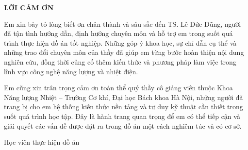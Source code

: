 \documentclass[../main.tex]{subfiles}
\begin{document}
\begin{center}
  \Large{\textbf{LỜI CẢM ƠN}}\\
\end{center}
\vspace{1cm}

Em xin bày tỏ lòng biết ơn chân thành và sâu sắc đến TS. Lê Đức Dũng, người đã tận tình hướng dẫn, định hướng chuyên môn và hỗ trợ em trong suốt quá trình thực hiện đồ án tốt nghiệp. Những góp ý khoa học, sự chỉ dẫn cụ thể và những trao đổi chuyên môn của thầy đã giúp em từng bước hoàn thiện nội dung nghiên cứu, đồng thời củng cố thêm kiến thức và phương pháp làm việc trong lĩnh vực công nghệ năng lượng và nhiệt điện.

Em cũng xin trân trọng cảm ơn toàn thể quý thầy cô giảng viên thuộc Khoa Năng lượng Nhiệt -- Trường Cơ khí, Đại học Bách khoa Hà Nội, những người đã trang bị cho em hệ thống kiến thức nền tảng và tư duy kỹ thuật cần thiết trong suốt quá trình học tập. Đây là hành trang quan trọng để em có thể tiếp cận và giải quyết các vấn đề được đặt ra trong đồ án một cách nghiêm túc và có cơ sở.

\begin{flushright}
Học viên thực hiện đồ án \\[0.5em]


\end{flushright}
\end{document}
